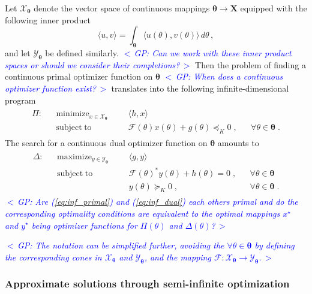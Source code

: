 \documentclass{article}
\DeclareMathOperator*{\minimize}{minimize}
\DeclareMathOperator*{\maximize}{maximize}
\DeclareMathOperator*{\subj}{subject\;to}
\newcommand{\commentGP}[1]{\noindent \textcolor{blue}{\emph{$<\,$GP: #1$\,>$}}}%
\newcommand{\opt}{\star}                    %
\newcommand{\ppar}{\theta}                          %
\newcommand{\Ppar}{{\bm{\theta}}}                   %
\newcommand{\X}{\mathbf{X}}                         %
\newcommand{\Y}{\mathbf{Y}}                         %
\newcommand{\calF}{\mathcal{F}}                     %
\newcommand{\Xm}{{\bm{\mathcal{X}}_{\Ppar}}}        %
\newcommand{\Ym}{{\bm{\mathcal{Y}}_{\Ppar}}}        %
\begin{document}
Let $\Xm$ denote the vector space of continuous mappings $\Ppar \rightarrow \X$ equipped with the following inner product
\[ \langle u,v \rangle = \int_{\Ppar} \langle u(\ppar), v(\ppar) \rangle \, d\ppar\,,%
\]
and let $\Ym$ be defined similarly. \commentGP{Can we work with these inner product spaces or should we consider their completions?} Then the problem of finding a continuous primal optimizer function on $\Ppar$ \commentGP{When does a continuous optimizer function exist?} translates into the following infinite-dimensional program
\begin{gather}\label{eq:inf_primal}
\begin{aligned}
\Pi: && \minimize_{x\in\Xm} &&& \langle h, x \rangle\\
     && \subj               &&& \calF(\ppar)x(\ppar) + g(\ppar)\preceq_K 0 \;, && \forall \ppar\in\Ppar\;.%
\end{aligned}
\end{gather}
The search for a continuous dual optimizer function on $\Ppar$ amounts to
\begin{gather}\label{eq:inf_dual}
\begin{aligned}
\Delta: && \maximize_{y\in\Ym} &&& \langle g , y \rangle\\
        && \subj               &&& \calF(\ppar)^* y(\ppar) + h(\ppar)= 0 \;, && \forall \ppar \in\Ppar\\%
        &&                     &&& y(\ppar) \succeq_K 0                  \;, && \forall \ppar \in\Ppar\;.%
\end{aligned}
\end{gather}
\commentGP{Are (\ref{eq:inf_primal}) and (\ref{eq:inf_dual}) each others primal and do the corresponding optimality conditions are equivalent to the optimal mappings $x^\opt$ and $y^\opt$ being optimizer functions for $\Pi(\ppar)$ and $\Delta(\ppar)$?}

\commentGP{The notation can be simplified further, avoiding the $\forall \ppar\in\Ppar$ by defining the corresponding cones in $\Xm$ and $\Ym$, and the mapping $\calF:\Xm\rightarrow\Ym$.}


\subsubsection{Approximate solutions through semi-infinite optimization}%
\end{document}
